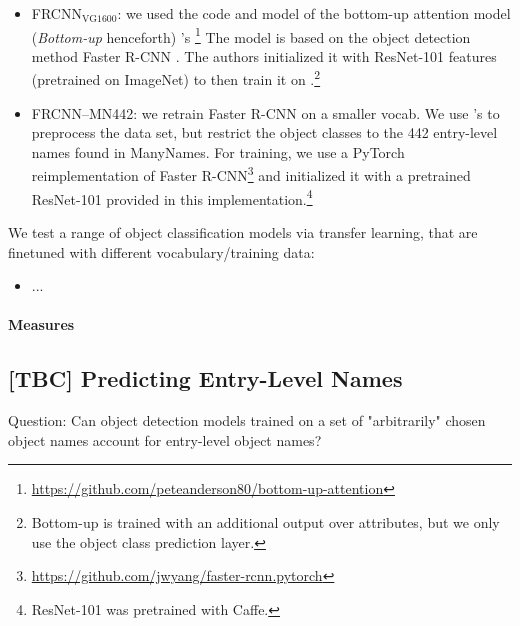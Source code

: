 \begin{itemize}
\item FRCNN$_{\text{VG1600}}$: we used the code and model of the bottom-up attention model (\textit{Bottom-up} henceforth)  \citeauthor{anderson2018updown}'s \citeyear{anderson2018updown} \footnote{\url{https://github.com/peteanderson80/bottom-up-attention}} The model is based on the object detection method Faster R-CNN \cite{fasterrcnn2015}. The authors initialized it with ResNet-101 \cite{he2016deep} features (pretrained on ImageNet) to then train it on \vg.\footnote{Bottom-up is trained with an additional output over attributes, but we only use the object class prediction layer.} 

\item FRCNN--MN442: we retrain Faster R-CNN \cite{fasterrcnn2015} on a smaller vocab. We use \citeauthor{anderson2018updown}'s to preprocess the data set, but restrict the object classes to the 442 entry-level names found in ManyNames. For training, we use a PyTorch reimplementation of Faster R-CNN\footnote{\url{https://github.com/jwyang/faster-rcnn.pytorch}} and initialized it with a pretrained ResNet-101 provided in this implementation.\footnote{ResNet-101 was pretrained with Caffe.}
\end{itemize}

We test a range of object classification models via transfer learning, that are finetuned with different vocabulary/training data:

\begin{itemize}
\item ...
\end{itemize}

\paragraph{Measures}


\subsection{[TBC] Predicting Entry-Level Names}
\label{sect:exp_entry}
Question: Can object detection models trained on a set of "arbitrarily" chosen object names account for entry-level object names? 

